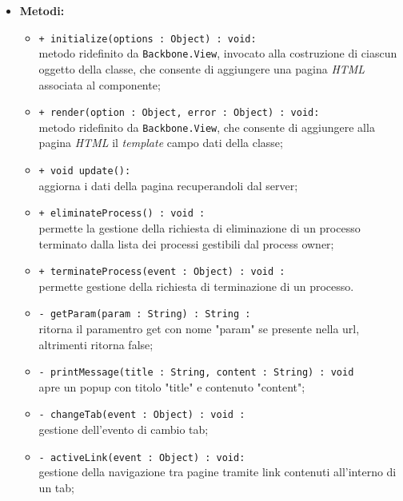 \begin{flushleft}
\begin{itemize}
\begin{sloppypar}
\begin{itemize}
\end{itemize}
\end{sloppypar}
\item \textbf{Metodi:}
\begin{sloppypar}
\begin{itemize}
\item \texttt{+ initialize(options : Object) : void:}\\ metodo ridefinito da \texttt{Backbone.View}, invocato alla costruzione di ciascun oggetto della classe, che consente di aggiungere una pagina \textit{HTML} associata al componente;
\item \texttt{+ render(option : Object, error : Object) : void:}\\ metodo ridefinito da \texttt{Backbone.View}, che consente di aggiungere alla pagina \textit{HTML} il \textit{template} campo dati della classe;
\item \texttt{+ void update():}\\ aggiorna i dati della pagina recuperandoli dal server;
\item \texttt{+ eliminateProcess() : void :}\\ permette la gestione della richiesta di eliminazione di un processo terminato dalla lista dei processi gestibili dal process owner;
\item \texttt{+ terminateProcess(event : Object) : void :}\\ permette gestione della richiesta di terminazione di un processo.
\item \texttt{- getParam(param : String) : String :}\\ ritorna il paramentro get con nome "param" se presente nella url, altrimenti ritorna false;
\item \texttt{- printMessage(title : String, content : String) : void}\\ apre un popup con titolo "title" e contenuto "content";
\item \texttt{- changeTab(event : Object) : void :}\\ gestione dell'evento di cambio tab;
\item \texttt{- activeLink(event : Object) : void:}\\ gestione della navigazione tra pagine tramite link contenuti all'interno di un tab;
\end{itemize}
\end{sloppypar}
\end{itemize}
\end{flushleft}

